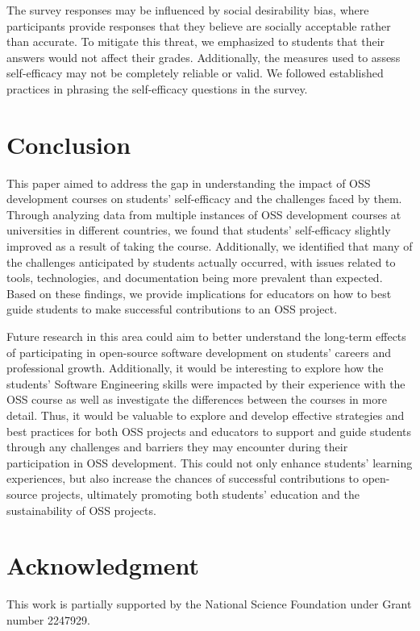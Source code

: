 \documentclass[sigconf]{acmart}
\begin{document}
\begin{sloppy}
The survey responses may be influenced by social desirability bias, where participants provide responses that they believe are socially acceptable rather than accurate. To mitigate this threat, we emphasized to students that their answers would not affect their grades. Additionally, the measures used to assess self-efficacy may not be completely reliable or valid. We followed established practices in phrasing the self-efficacy questions in the survey.

\section{Conclusion}

This paper aimed to address the gap in understanding the impact of OSS development courses on students' self-efficacy and the challenges faced by them. Through analyzing data from multiple instances of OSS development courses at universities in different countries, we found that students' self-efficacy slightly improved as a result of taking the course. Additionally, we identified that many of the challenges anticipated by students actually occurred, with issues related to tools, technologies, and documentation being more prevalent than expected. Based on these findings, we provide implications for educators on how to best guide students to make successful contributions to an OSS project.

Future research in this area could aim to better understand the long-term effects of participating in open-source software development on students' careers and professional growth. Additionally, it would be interesting to explore how the students' Software Engineering skills were impacted by their experience with the OSS course as well as investigate the differences between the courses in more detail. Thus, it would be valuable to explore and develop effective strategies and best practices for both OSS projects and educators to support and guide students through any challenges and barriers they may encounter during their participation in OSS development. This could not only enhance students' learning experiences, but also increase the chances of successful contributions to open-source projects, ultimately promoting both students' education and the sustainability of OSS projects.

\section*{Acknowledgment}

This work is partially supported by the National Science Foundation under Grant number 2247929.





\end{sloppy}
\end{document}
